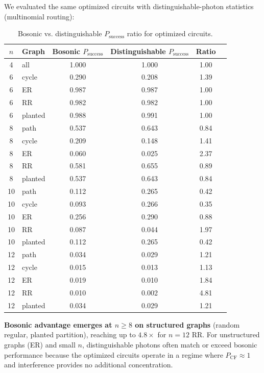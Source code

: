 We evaluated the same optimized circuits with distinguishable-photon statistics (multinomial routing):

\begin{table}[ht]
\centering
\caption{Bosonic vs. distinguishable $P_{\mathrm{success}}$ ratio for optimized circuits.}
\label{tab:boson_vs_dist}
\begin{tabular}{clcccc}
\toprule
$n$ & Graph & Bosonic $P_{\mathrm{success}}$ & Distinguishable $P_{\mathrm{success}}$ & Ratio \\
\midrule
4 & all & 1.000 & 1.000 & 1.00 \\
6 & cycle & 0.290 & 0.208 & 1.39 \\
6 & ER & 0.987 & 0.987 & 1.00 \\
6 & RR & 0.982 & 0.982 & 1.00 \\
6 & planted & 0.988 & 0.991 & 1.00 \\
\midrule
8 & path & 0.537 & 0.643 & 0.84 \\
8 & cycle & 0.209 & 0.148 & 1.41 \\
8 & ER & 0.060 & 0.025 & 2.37 \\
8 & RR & 0.581 & 0.655 & 0.89 \\
8 & planted & 0.537 & 0.643 & 0.84 \\
\midrule
10 & path & 0.112 & 0.265 & 0.42 \\
10 & cycle & 0.093 & 0.266 & 0.35 \\
10 & ER & 0.256 & 0.290 & 0.88 \\
10 & RR & 0.087 & 0.044 & 1.97 \\
10 & planted & 0.112 & 0.265 & 0.42 \\
\midrule
12 & path & 0.034 & 0.029 & 1.21 \\
12 & cycle & 0.015 & 0.013 & 1.13 \\
12 & ER & 0.019 & 0.010 & 1.84 \\
12 & RR & 0.010 & 0.002 & 4.81 \\
12 & planted & 0.034 & 0.029 & 1.21 \\
\bottomrule
\end{tabular}
\end{table}

\textbf{Bosonic advantage emerges at $n\ge 8$ on structured graphs} (random regular, planted partition), reaching up to $4.8\times$ for $n=12$ RR. For unstructured graphs (ER) and small $n$, distinguishable photons often match or exceed bosonic performance because the optimized circuits operate in a regime where $P_{\mathrm{CF}} \approx 1$ and interference provides no additional concentration.

